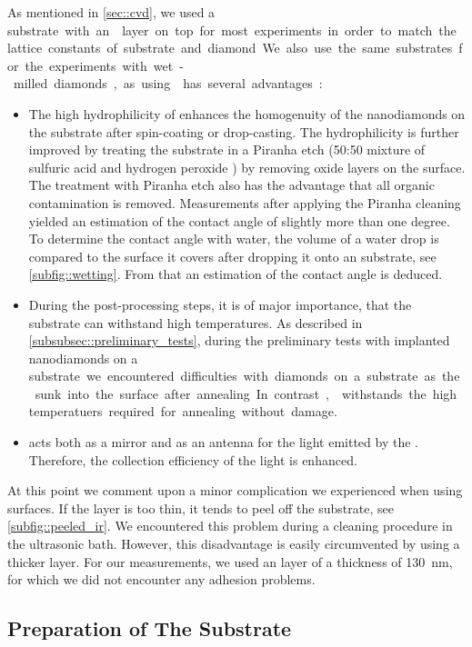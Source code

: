 	As mentioned in \autoref{sec::cvd}, we used a \si substrate with an \ir layer on top for most experiments in order to match the lattice constants of substrate and diamond.
	We also use the same substrates for the experiments with wet-milled diamonds, as using \ir has several advantages:

	\begin{itemize}
		\item The high hydrophilicity of \ir enhances the homogenuity of the nanodiamonds on the substrate after spin-coating or drop-casting.
		The hydrophilicity is further improved by treating the substrate in a Piranha etch (50:50 mixture of sulfuric acid  and hydrogen peroxide ) by removing oxide layers on the surface.
		The treatment with Piranha etch also has the advantage that all organic contamination is removed.
		Measurements after applying the Piranha cleaning yielded an estimation of the contact angle of slightly more than one degree.
		To determine the contact angle with water, the volume of a water drop is compared to the surface it covers after dropping it onto an \ir substrate, see \autoref{subfig::wetting}.	From that an estimation of the contact angle is deduced.
		\item During the post-processing steps, it is of major importance, that the substrate can withstand high temperatures.
		As described in \autoref{subsubsec::preliminary_tests}, during the preliminary tests with implanted nanodiamonds on a \si substrate we encountered difficulties with diamonds on a \si substrate as the sunk into the surface after annealing.
		In contrast, \ir withstands the high temperatuers required for annealing without damage.
		\item \Ir acts both as a mirror and as an antenna for the \fl light emitted by the \siv \cite{Neu2012a}.
		Therefore, the collection efficiency of the \fl light is enhanced.
	\end{itemize}

	At this point we comment upon a minor complication we experienced when using \ir surfaces.
	If the \ir layer is too thin, it tends to peel off the substrate, see \autoref{subfig::peeled_ir}.
	We encountered this problem during a cleaning procedure in the ultrasonic bath.
	However, this disadvantage is easily circumvented by using a thicker \ir layer.
	For our measurements, we used an \ir layer of a thickness of \SI{130}{nm}, for which we did not encounter any adhesion problems.

	\subsection{Preparation of The Substrate}

